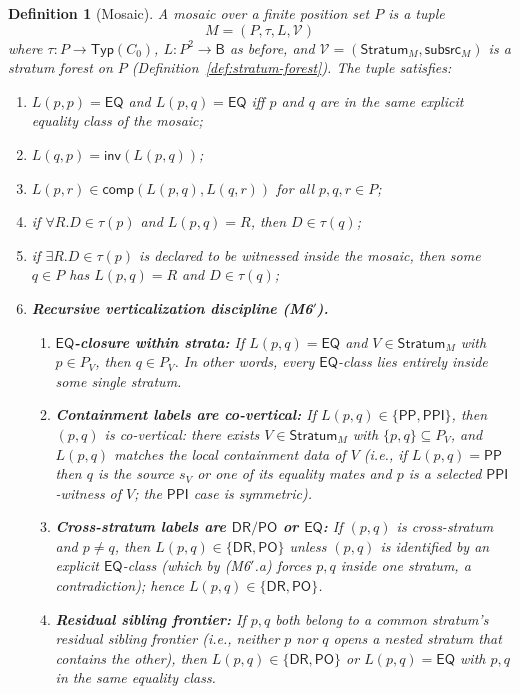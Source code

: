 \documentclass[11pt]{article}
\newtheorem{definition}[theorem]{Definition}
\newcommand{\Base}{\mathsf{B}}
\newcommand{\EQ}{\mathsf{EQ}}
\newcommand{\DR}{\mathsf{DR}}
\newcommand{\PO}{\mathsf{PO}}
\newcommand{\PP}{\mathsf{PP}}
\newcommand{\PPI}{\mathsf{PPI}}
\newcommand{\Inv}{\mathsf{inv}}
\newcommand{\comp}{\mathsf{comp}}
\newcommand{\Typ}{\mathsf{Typ}}
\newcommand{\Stratum}{\mathsf{Stratum}}
\newcommand{\Subsrc}{\mathsf{subsrc}}
\begin{document}
\begin{definition}[Mosaic]\label{def:mosaic}
A mosaic over a finite position set $P$ is a tuple
\[
  M=(P,\tau,L,\mathcal V)
\]
where $\tau:P\to\Typ(C_0)$, $L:P^2\to\Base$ as before, and
$\mathcal V=(\Stratum_M,\Subsrc_M)$ is a stratum forest on $P$
(Definition~\ref{def:stratum-forest}).  The tuple satisfies:
\begin{enumerate}[label=(M\arabic*)]
\item $L(p,p)=\EQ$ and $L(p,q)=\EQ$ iff $p$ and $q$ are in the same explicit equality class of the mosaic;
\item $L(q,p)=\Inv(L(p,q))$;
\item $L(p,r)\in\comp(L(p,q),L(q,r))$ for all $p,q,r\in P$;
\item if $\forall R.D\in\tau(p)$ and $L(p,q)=R$, then $D\in\tau(q)$;
\item if $\exists R.D\in\tau(p)$ is declared to be witnessed inside the mosaic, then some $q\in P$ has $L(p,q)=R$ and $D\in\tau(q)$;
\item \textbf{Recursive verticalization discipline (M6$'$).}
  \begin{enumerate}[label=(\alph*)]
  \item \textbf{$\EQ$-closure within strata:}  If $L(p,q)=\EQ$ and
    $V\in\Stratum_M$ with $p\in P_V$, then $q\in P_V$.  In other
    words, every $\EQ$-class lies entirely inside some single
    stratum.
  \item \textbf{Containment labels are co-vertical:}  If $L(p,q)\in
    \{\PP,\PPI\}$, then $(p,q)$ is co-vertical: there exists
    $V\in\Stratum_M$ with $\{p,q\}\subseteq P_V$, and $L(p,q)$
    matches the local containment data of $V$ (i.e., if $L(p,q)=\PP$
    then $q$ is the source $s_V$ or one of its equality mates and
    $p$ is a selected $\PPI$-witness of $V$; the $\PPI$ case is
    symmetric).
  \item \textbf{Cross-stratum labels are $\DR/\PO$ or $\EQ$:}  If
    $(p,q)$ is cross-stratum and $p\neq q$, then $L(p,q)\in\{\DR,
    \PO\}$ unless $(p,q)$ is identified by an explicit $\EQ$-class
    (which by (M6$'$.a) forces $p,q$ inside one stratum, a
    contradiction); hence $L(p,q)\in\{\DR,\PO\}$.
  \item \textbf{Residual sibling frontier:}  If $p,q$ both belong to
    a common stratum's residual sibling frontier (i.e., neither $p$
    nor $q$ opens a nested stratum that contains the other), then
    $L(p,q)\in\{\DR,\PO\}$ or $L(p,q)=\EQ$ with $p,q$ in the same
    equality class.
  \end{enumerate}
\end{enumerate}
\end{definition}
\end{document}
